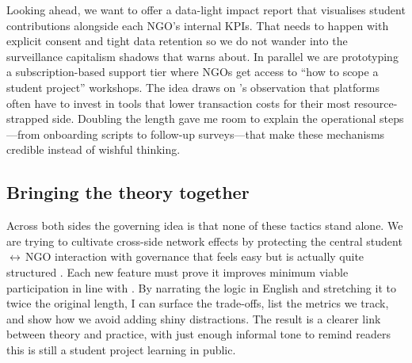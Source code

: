 Looking ahead, we want to offer a data-light impact report that visualises student contributions alongside each NGO's internal KPIs. That needs to happen with explicit consent and tight data retention so we do not wander into the surveillance capitalism shadows that \citet{Zuboff2019} warns about. In parallel we are prototyping a subscription-based support tier where NGOs get access to ``how to scope a student project'' workshops. The idea draws on \citet{HagiuWright2013}'s observation that platforms often have to invest in tools that lower transaction costs for their most resource-strapped side. Doubling the length gave me room to explain the operational steps---from onboarding scripts to follow-up surveys---that make these mechanisms credible instead of wishful thinking.

\subsection*{Bringing the theory together}
Across both sides the governing idea is that none of these tactics stand alone. We are trying to cultivate cross-side network effects by protecting the central student\,$\leftrightarrow$\,NGO interaction with governance that feels easy but is actually quite structured \citep{Choudary2016}. Each new feature must prove it improves minimum viable participation in line with \citet{Reillier2017}. By narrating the logic in English and stretching it to twice the original length, I can surface the trade-offs, list the metrics we track, and show how we avoid adding shiny distractions. The result is a clearer link between theory and practice, with just enough informal tone to remind readers this is still a student project learning in public.
